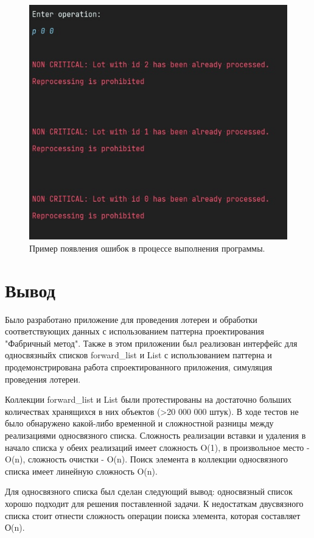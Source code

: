 \documentclass[a4paper,14pt]{article}
\begin{document}
\begin{figure}[H]
  \centering
  \captionsetup{justification=centering,margin=1cm}
  \includegraphics{pictures/11}
  \caption{Пример появления ошибок в процессе выполнения программы.}
\end{figure}
\clearpage

\section{Вывод}
Было разработано приложение для проведения лотереи и обработки соответствующих данных с использованием паттерна проектирования "Фабричный метод". Также в этом приложении был реализован интерфейс для односвязныйх списков forward\_list и List с использованием паттерна \textquotedbl{} и продемонстрирована работа спроектированного приложения, симуляция проведения лотереи.

Коллекции forward\_list и List были протестированы на достаточно больших количествах хранящихся в них объектов (>20 000 000 штук). В ходе тестов не было обнаружено какой-либо временной и сложностной разницы между реализациями односвязного списка. Сложность реализации вставки и удаления в начало списка у обеих реализаций имеет сложность O(1), в произвольное место - O(n), сложность очистки - O(n). Поиск элемента в коллекции односвязного списка имеет линейную сложность O(n).

Для односвязного списка был сделан следующий вывод: односвязный список хорошо подходит для решения поставленной задачи. К недостаткам двусвязного списка стоит отнести сложность операции поиска элемента, которая
составляет О(n).
\newpage
\end{document}
